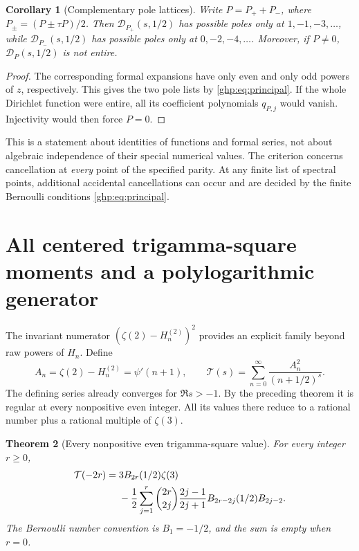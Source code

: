 \documentclass[11pt,a4paper]{article}
\numberwithin{equation}{section}
\newtheorem{theorem}{Theorem}[section]
\newtheorem{corollary}[theorem]{Corollary}
\theoremstyle{definition}
\theoremstyle{remark}
\begin{document}
\begin{corollary}[Complementary pole lattices]\label{ghp:cor:split}
Write $P=P_++P_-$, where $P_\pm=(P\pm\tau P)/2$. Then
$\mathcal D_{P_+}(s,1/2)$ has possible poles only at
$1,-1,-3,\ldots$, while $\mathcal D_{P_-}(s,1/2)$ has possible poles
only at $0,-2,-4,\ldots$. Moreover, if $P\ne0$,
$\mathcal D_P(s,1/2)$ is not entire.
\end{corollary}
\begin{proof}
The corresponding formal expansions have only even and only odd
powers of $z$, respectively. This gives the two pole lists by
\eqref{ghp:eq:principal}. If the whole Dirichlet function were entire,
all its coefficient polynomials $q_{P,j}$ would vanish. Injectivity
would then force $P=0$.
\end{proof}

This is a statement about identities of functions and formal series,
not about algebraic independence of their special numerical values.
The criterion concerns cancellation at \emph{every} point of the
specified parity. At any finite list of spectral points, additional
accidental cancellations can occur and are decided by the finite
Bernoulli conditions \eqref{ghp:eq:principal}.

\section{All centered trigamma-square moments and a polylogarithmic generator}
\label{ghp:square:sec}

The invariant numerator $(\zeta(2)-H_n^{(2)})^2$ provides an explicit
family beyond raw powers of $H_n$. Define
\begin{equation}\label{ghp:def:square}
 A_n=\zeta(2)-H_n^{(2)}=\psi'(n+1),\qquad
 \mathcal T(s)=\sum_{n=0}^{\infty}\frac{A_n^2}{(n+1/2)^s}.
\end{equation}
The defining series already converges for $\Re s>-1$. By the preceding
theorem it is regular at every nonpositive even integer. All its values
there reduce to a rational number plus a rational multiple of
$\zeta(3)$.

\begin{theorem}[Every nonpositive even trigamma-square value]
\label{ghp:thm:square}
For every integer $r\geq0$,
\begin{align}\label{ghp:eq:all-square}
 \mathcal T(-2r)={}&3B_{2r}(1/2)\zeta(3)\notag\\
 &-\frac12\sum_{j=1}^{r}\binom{2r}{2j}
   \frac{2j-1}{2j+1}B_{2r-2j}(1/2)B_{2j-2}.
\end{align}
The Bernoulli number convention is $B_1=-1/2$, and the sum is empty
when $r=0$.
\end{theorem}
\end{document}
